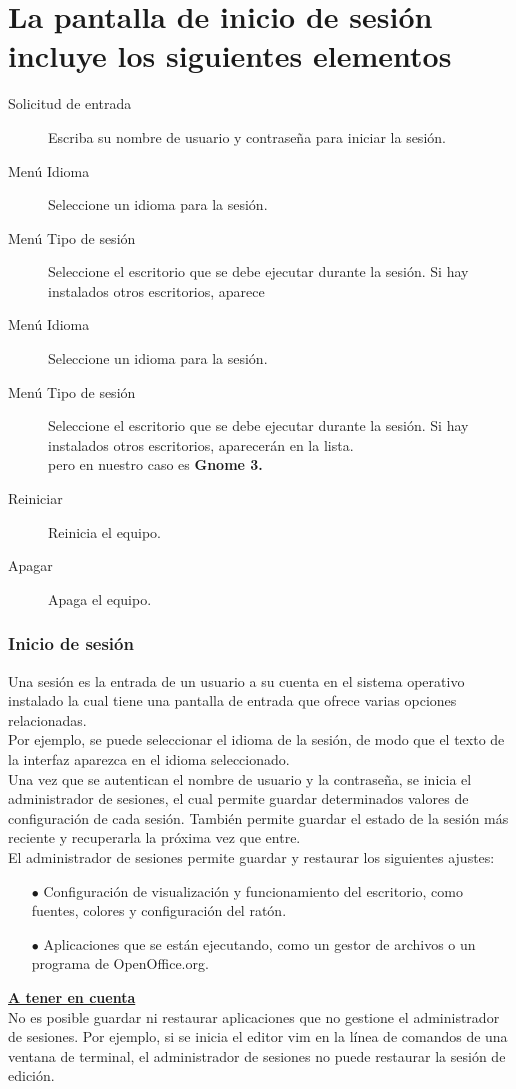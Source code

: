 \documentclass[12pt,letterpaper]{book}
\begin{document}
\section{La pantalla de inicio de sesión incluye los siguientes elementos}
\begin{description}
\item[Solicitud de entrada] Escriba su nombre de usuario y contraseña para iniciar la sesión.
\item[Menú Idioma] Seleccione un idioma para la sesión.
\item [Menú Tipo de sesión] Seleccione el escritorio que se debe ejecutar durante la sesión. Si hay instalados otros escritorios, aparece
\item[Menú Idioma] Seleccione un idioma para la sesión.
\item [Menú Tipo de sesión] Seleccione el escritorio que se debe ejecutar durante la sesión. Si hay instalados otros escritorios, aparecerán en la lista.\\ pero en nuestro caso es {\bf Gnome 3.}
\item[Reiniciar] Reinicia el equipo.
\item[Apagar] Apaga el equipo.
\end{description}
\subsubsection{Inicio de sesión}
Una sesión es la entrada de un usuario a su cuenta en el sistema operativo instalado la cual tiene una pantalla de entrada que ofrece varias opciones relacionadas.\\
Por ejemplo, se puede seleccionar el idioma de la sesión, de modo que el texto de la interfaz aparezca en el idioma seleccionado.\\
Una vez que se autentican el nombre de usuario y la contraseña, se inicia el administrador de sesiones, el cual permite guardar determinados valores de configuración de cada sesión. También permite guardar el estado de la sesión más reciente y recuperarla la próxima vez que entre.\\
El administrador de sesiones permite guardar y restaurar los siguientes ajustes:
\begin{itemize}
\item[$\bullet$] Configuración de visualización y funcionamiento del escritorio, como fuentes, colores y configuración del ratón.
\item[$\bullet$] Aplicaciones que se están ejecutando, como un gestor de archivos o un programa de OpenOffice.org.
\end{itemize}
{\bf \underline{A tener en cuenta}}\\
No es posible guardar ni restaurar aplicaciones que no gestione el administrador de sesiones. Por ejemplo, si se inicia el editor vim en la línea de comandos de una ventana de terminal, el administrador de sesiones no puede restaurar la sesión de edición.
\end{document}

